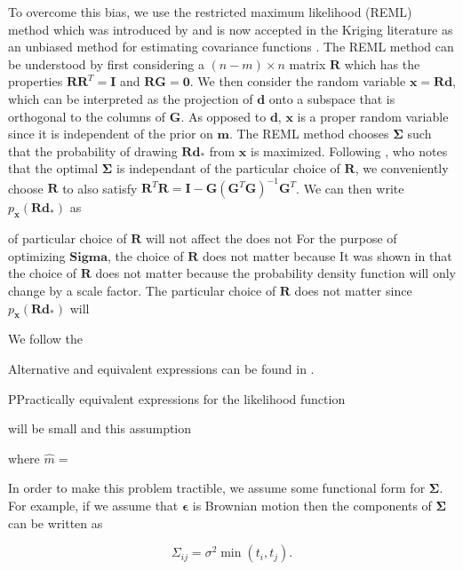 \documentclass[10pt,a4paper]{article}
\begin{document}
To overcome this bias, we use the restricted maximum likelihood (REML) method which was introduced by \citet{Patterson1971} and is now accepted in the Kriging literature as an unbiased method for estimating covariance functions \citep[e.g.][]{Cressie1992}. The REML method can be understood by first considering a $(n-m)\times n$ matrix $\mathbf{R}$ which has the properties $\mathbf{R}\mathbf{R}^T = \mathbf{I}$ and $\mathbf{R}\mathbf{G}=\mathbf{0}$.  We then consider the random variable $\mathbf{x}=\mathbf{R}\mathbf{d}$, which can be interpreted as the projection of $\mathbf{d}$ onto a subspace that is orthogonal to the columns of $\mathbf{G}$. As opposed to $\mathbf{d}$, $\mathbf{x}$ is a proper random variable since it is independent of the prior on $\mathbf{m}$. The REML method chooses $\mathbf{\Sigma}$ such that the probability of drawing $\mathbf{R}\mathbf{d}_*$ from $\mathbf{x}$ is maximized. Following \citet{Harville1974}, who notes that the optimal $\mathbf{\Sigma}$ is independant of the particular choice of $\mathbf{R}$, we conveniently choose $\mathbf{R}$ to also satisfy $\mathbf{R}^T\mathbf{R} = \mathbf{I} - \mathbf{G}(\mathbf{G}^T\mathbf{G})^{-1}\mathbf{G}^T$. We can then write $p_\mathbf{x}(\mathbf{R}\mathbf{d}_*)$ as



of particular choice of $\mathbf{R}$ will not affect the   does not For the purpose of optimizing $\mathbf{Sigma}$, the choice of $\mathbf{R}$ does not matter because It was shown in \citet{Harville1974} that the choice of $\mathbf{R}$ does not matter because the probability density function will only change by a scale factor. The particular choice of $\mathbf{R}$ does not matter since $p_\mathbf{x}(\mathbf{R}\mathbf{d}_*)$ will   
        

We follow the 

Alternative and equivalent expressions can be found in \citet{Wahba1985,Rassmussen2006}.  

   

PPractically equivalent expressions for the likelihood function 

will be small and this assumption      

where $\hat{m}=$  

In order to make this problem tractible, we assume some functional form for $\mathbf{\Sigma}$. For example, if we assume that $\mathbf{\epsilon}$ is Brownian motion then the components of $\mathbf{\Sigma}$ can be written as

\begin{equation}\label{RandomWalk}
  \Sigma_{ij} = \sigma^2\min(t_i,t_j).
\end{equation}
\end{document}
